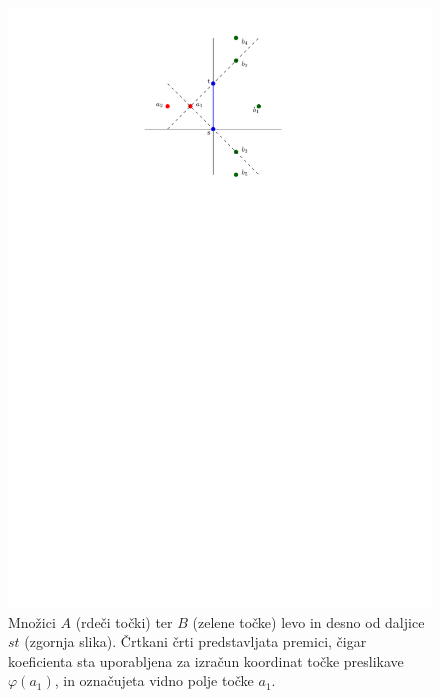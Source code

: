 \documentclass[a4paper, 12pt]{book}
\begin{document}
\begin{figure}
\centerline{\includegraphics[scale=1]{pics/dual_problem3.pdf}}
\caption{Množici $A$ (rdeči točki) ter $B$ (zelene točke) levo in desno od daljice $st$ (zgornja slika). Črtkani črti predstavljata premici, čigar koeficienta sta uporabljena za izračun koordinat točke preslikave $\varphi (a_1)$, in označujeta vidno polje točke $a_1$.} 
\label{dualp}
\end{figure}
\end{document}
